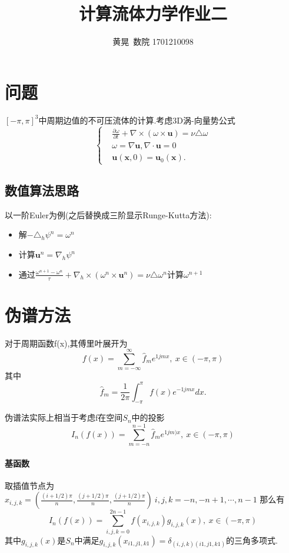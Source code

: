 \documentclass[UTF8]{ctexart}
\author{黄晃\ 数院 1701210098 }
\title{计算流体力学作业二}
\begin{document}
  \maketitle

\section{问题}
$[-\pi,\pi]^3$中周期边值的不可压流体的计算.考虑3D涡-向量势公式
\begin{equation*}
  \left\{
  \begin{split}
       & \frac{\partial\omega}{\partial t}+\nabla \times(\omega \times \mathbf{u}) = \nu \triangle \omega \\
       & \omega = \nabla \mathbf{u},\nabla \cdot \mathbf{u}=0 \\
       & \mathbf{u}(\mathbf{x},0) = \mathbf{u}_0(\mathbf{x}).
  \end{split}
  \right.
\end{equation*}
\subsection{数值算法思路}
以一阶Euler为例(之后替换成三阶显示Runge-Kutta方法):
\begin{itemize}
  \item 解$-\triangle_h \psi^n = \omega^n$
  \item 计算$\mathbf{u}^n=\nabla_h \psi^n$
  \item 通过$\frac{\omega^{n+1}-\omega^n}{\tau}+\nabla_h\times(\omega^n \times \mathbf{u}^n) = \nu \triangle \omega^n$计算$\omega^{n+1}$
\end{itemize}

\section{伪谱方法}
对于周期函数f(x),其傅里叶展开为
$$
f(x) = \sum\limits _{m=-\infty }^{\infty}\hat{f}_{m}e^{1jmx},\ x\in (-\pi,\pi)
$$
其中
$$
\hat{f}_{m}=\frac{1}{2\pi}\int_{-\pi}^{\pi}f(x)e^{-1jmx}dx.
$$


伪谱法实际上相当于考虑f在空间$S_{n}$中的投影
$$
I_n(f(x)) = \sum\limits_{m=-n}^{n-1}\hat{f}_{m}e^{1jm)x},\ x\in (-\pi,\pi)
$$
\paragraph{基函数}
取插值节点为
$x_{i,j,k}=(\frac{(i+1/2)\pi}{n},\frac{(j+1/2)\pi}{n},\frac{(j+1/2)\pi}{n})\ i,j,k=-n,-n+1,\cdots,n-1$
那么有
$$
I_n(f(x)) = \sum\limits_{i,j,k=0}^{2n-1}f(x_{i,j,k})g_{i,j,k}(x),\ x\in (-\pi,\pi)
$$
其中$g_{i,j,k}(x)$是$S_{n}$中满足$g_{i,j,k}(x_{i1,j1,k1})=\delta_{(i,j,k)(i1,j1,k1)}$的三角多项式.
\end{document}
